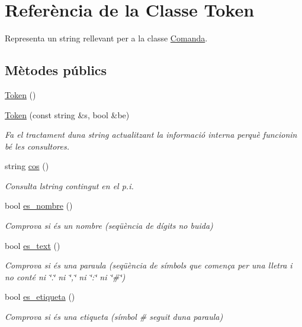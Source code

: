 \hypertarget{class_token}{}\section{Referència de la Classe Token}
\label{class_token}


Representa un string rellevant per a la classe \hyperlink{class_comanda}{Comanda}.  


\subsection*{Mètodes públics}
\begin{DoxyCompactItemize}
\item 
\hyperlink{class_token_aa3c5868ba4115f3189df6b2ac5b36f39}{Token} ()
\item 
\hyperlink{class_token_a2ecb0099476455ed7ce3c05abcbb2e31}{Token} (const string \&s, bool \&be)
\begin{DoxyCompactList}\small\item\em Fa el tractament d\textquotesingle{}una string actualitzant la informació interna perquè funcionin bé les consultores. \end{DoxyCompactList}\item 
string \hyperlink{class_token_a3cadf105c92e161b50eea2d8096cb608}{cos} ()
\begin{DoxyCompactList}\small\item\em Consulta l\textquotesingle{}string contingut en el p.\+i. \end{DoxyCompactList}\item 
bool \hyperlink{class_token_a53411d8b5b08289a126944104d246380}{es\+\_\+nombre} ()
\begin{DoxyCompactList}\small\item\em Comprova si és un nombre (seqüència de dígits no buida) \end{DoxyCompactList}\item 
bool \hyperlink{class_token_ab40c482fd70278c5f8ce53aa364d957e}{es\+\_\+text} ()
\begin{DoxyCompactList}\small\item\em Comprova si és una paraula (seqüència de símbols que comença per una lletra i no conté ni \char`\"{}.\char`\"{} ni \char`\"{},\char`\"{} ni \char`\"{}\+:\char`\"{} ni \char`\"{}\#\char`\"{}) \end{DoxyCompactList}\item 
bool \hyperlink{class_token_ad2949808a3a5d2afba78768e18005cbd}{es\+\_\+etiqueta} ()
\begin{DoxyCompactList}\small\item\em Comprova si és una etiqueta (símbol \# seguit d\textquotesingle{}una paraula) \end{DoxyCompactList}\item 

\end{DoxyCompactItemize}
